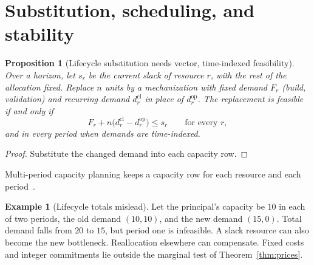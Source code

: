 \documentclass[11pt]{article}
\newtheorem{proposition}[theorem]{Proposition}
\theoremstyle{definition}
\newtheorem{example}[theorem]{Example}
\theoremstyle{remark}
\begin{document}
\section{Substitution, scheduling, and stability}\label{sec:scheduling}
\begin{proposition}[Lifecycle substitution needs vector, time-indexed feasibility]\label{prop:lifecycle}
Over a horizon, let $s_r$ be the current slack of resource $r$, with the rest of the allocation fixed.
Replace $n$ units by a mechanization with fixed demand $F_r$ (build, validation) and recurring demand
$d^{\mathrm{cl}}_r$ in place of $d^{\mathrm{op}}_r$. The replacement is feasible if and only if
\[
F_r+n\big(d^{\mathrm{cl}}_r-d^{\mathrm{op}}_r\big)\le s_r\qquad\text{for every }r,
\]
and in every period when demands are time-indexed.
\end{proposition}
\begin{proof}
Substitute the changed demand into each capacity row.
\end{proof}
Multi-period capacity planning keeps a capacity row for each resource and each
period~\cite{luss82}.
\begin{example}[Lifecycle totals mislead]\label{ex:lifecycle}
Let the principal's capacity be $10$ in each of two periods, the old demand $(10,10)$, and the new
demand $(15,0)$. Total demand falls from $20$ to $15$, but period one is infeasible. A slack resource
can also become the new bottleneck. Reallocation elsewhere can compensate. Fixed costs and integer
commitments lie outside the marginal test of Theorem~\ref{thm:prices}.
\end{example}
\end{document}
